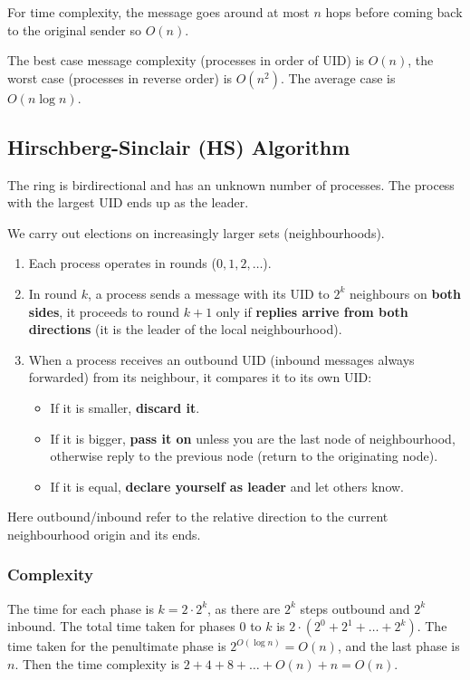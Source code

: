 \documentclass[11pt]{article}
\begin{document}
For time complexity, the message goes around at most $n$ hops before coming back to the original sender so $O(n)$.

The best case message complexity (processes in order of UID) is $O(n)$, the worst case (processes in reverse order) is $O(n^2)$.
The average case is $O(n \log n)$.

\subsection{Hirschberg-Sinclair (HS) Algorithm}
The ring is birdirectional and has an unknown number of processes.
The process with the largest UID ends up as the leader.

We carry out elections on increasingly larger sets (neighbourhoods).

\begin{enumerate}
  \item Each process operates in rounds ($0, 1, 2, \dots$).
  \item In round $k$, a process sends a message with its UID to $2^k$ neighbours on \textbf{both sides}, it proceeds to round $k + 1$ only if \textbf{replies arrive from both directions} (it is the leader of the local neighbourhood).
  \item When a process receives an outbound UID (inbound messages always forwarded) from its neighbour, it compares it to its own UID:
    \begin{itemize}
      \item If it is smaller, \textbf{discard it}.
      \item If it is bigger, \textbf{pass it on} unless you are the last node of neighbourhood, otherwise reply to the previous node (return to the originating node).
      \item If it is equal, \textbf{declare yourself as leader} and let others know.
    \end{itemize}
\end{enumerate}
Here outbound/inbound refer to the relative direction to the current neighbourhood origin and its ends.

\subsubsection{Complexity}
The time for each phase is $k = 2 \cdot 2^k$, as there are $2^k$ steps outbound and $2^k$ inbound.
The total time taken for phases $0$ to $k$ is $2 \cdot (2^0 + 2^1 + \dots + 2^k)$.
The time taken for the penultimate phase is $2^{O(\log n)}= O(n)$, and the last phase is $n$.
Then the time complexity is $2 + 4 + 8 + \dots + O(n) + n = O(n)$.
\end{document}

